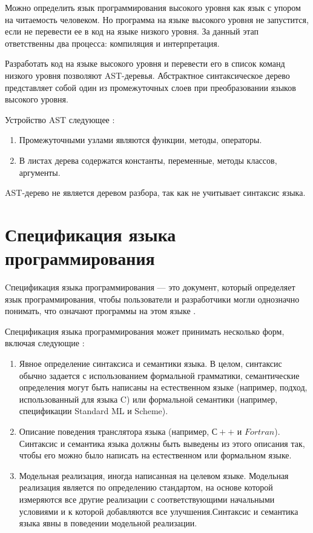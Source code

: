 \documentclass{mipt-thesis-bs}
\begin{document}
Можно определить язык программирования высокого уровня как язык с упором на читаемость человеком. Но
программа на языке высокого уровня не запустится, если не перевести ее в код на языке низкого уровня. За
данный этап ответственны два процесса: компиляция и интерпретация.

Разработать код на языке высокого уровня и перевести его в список команд низкого уровня позволяют AST-деревья.
Абстрактное синтаксическое дерево представляет собой один из промежуточных слоев при преобразовании языков
высокого уровня.

Устройство AST следующее \cite{dragon-book}:

\begin{enumerate}
    \item Промежуточными узлами являются функции, методы, операторы.
    \item В листах дерева содержатся константы, переменные, методы классов, аргументы.
\end{enumerate}

AST-дерево не является деревом разбора, так как не учитывает синтаксис языка.

\section{Спецификация языка программирования}

Cпецификация языка программирования — это документ, который определяет язык программирования, 
чтобы пользователи и разработчики могли однозначно понимать,
что означают программы на этом языке \cite{tsspec} \cite{spec-language}.

Спецификация языка программирования может принимать несколько форм, включая следующие \cite{sun-test}:

\begin{enumerate}
    \item Явное определение синтаксиса и семантики языка. В целом, синтаксис обычно 
    задается с использованием формальной грамматики, семантические определения 
    могут быть написаны на естественном языке (например, подход, использованный 
    для языка C) или формальной семантики (например, спецификации Standard ML и Scheme).
    \item Описание поведения транслятора языка (например, $С++$ и $Fortran$).
    Синтаксис и семантика языка должны быть выведены из этого описания так, 
    чтобы его можно было написать на естественном или формальном языке.
    \item Модельная реализация, иногда написанная на целевом языке. Модельная реализация
    является по определению стандартом, на основе которой измеряются все другие реализации с 
    соответствующими начальными условиями и к которой добавляются все улучшения.Синтаксис 
    и семантика языка явны в поведении модельной реализации. 
\end{enumerate}
\end{document}
